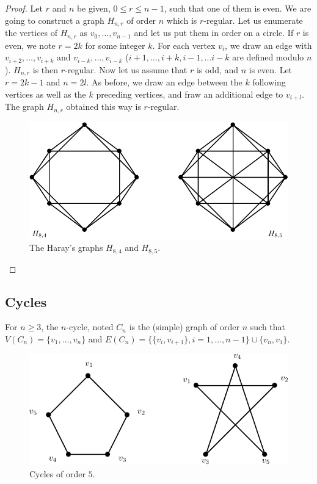 \documentclass[12pt,a4paper]{article}
\theoremstyle{definition}
\begin{document}
\begin{proof}
Let $r$ and $n$ be given, $0 \leq r \leq n-1$, such that one of them is even. We are going to construct a graph $H_{n,r}$ of order $n$ which is $r$-regular. Let us enumerate the vertices of $H_{n,r}$ as $v_0,  \dots , v_{n-1}$ and let us put them in order on a circle. If $r$ is even, we note $r=2k$ for some integer $k$. For each vertex $v_i$, we draw an edge with $v_{i+2}, \dots , v_{i+k}$ and $v_{i-k}, \dots , v_{i-k}$ ($i+1,…,i+k,i-1,…i-k$ are defined modulo $n$). $H_{n,r}$ is then $r$-regular. Now let us assume that $r$ is odd, and $n$ is even. Let $r=2k-1$ and $n=2l$. As before, we draw an edge between the $k$ following vertices as well as the $k$ preceding vertices, and fraw an additional edge to $v_{i+l}$. The graph $H_{n,r}$ obtained this way is $r$-regular.
\begin{figure}[hbtp]
\centering
\includegraphics[scale=.72]{images/haraysgraph.pdf}
\caption{The Haray's graphs $H_{8,4}$ and $H_{8,5}$.}
\end{figure}

\end{proof}
\newpage
\subsection{Cycles}
For $n \geq 3$, the $n$-cycle, noted $C_n$ is the (simple) graph of order $n$ such that $V(C_n)=\{v_1, \dots ,  v_n\}$ and $E(C_n)= \{ \{v_i, v_{i+1} \}, i = 1, \dots ,  n-1 \} \cup \{ v_n, v_1 \}$. 
\begin{figure}[hbtp]
\centering
\includegraphics[scale=1]{images/graph13.pdf}
\caption{Cycles of order $5$.}
\end{figure}
\end{document}
